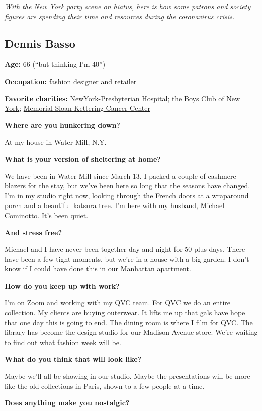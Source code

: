 \emph{With the New York party scene on hiatus, here is how some patrons
and society figures are spending their time and resources during the
coronavirus crisis.}

\hypertarget{dennis-basso}{%
\subsection{Dennis Basso}\label{dennis-basso}}

\textbf{Age:} 66 (``but thinking I'm 40'')

\textbf{Occupation:} fashion designer and retailer

\textbf{Favorite charities:}
\href{https://www.nyp.org}{NewYork-Presbyterian Hospital;}
\href{https://www.bcny.org}{the Boys Club of New York};
\href{https://www.mskcc.org}{Memorial Sloan Kettering Cancer Center}

\textbf{Where are you hunkering down?}

At my house in Water Mill, N.Y.

\textbf{What is your version of sheltering at home?}

We have been in Water Mill since March 13. I packed a couple of cashmere
blazers for the stay, but we've been here so long that the seasons have
changed. I'm in my studio right now, looking through the French doors at
a wraparound porch and a beautiful katsura tree. I'm here with my
husband, Michael Cominotto. It's been quiet.

\textbf{And stress free?}

Michael and I have never been together day and night for 50-plus days.
There have been a few tight moments, but we're in a house with a big
garden. I don't know if I could have done this in our Manhattan
apartment.

\textbf{How do you keep up with work?}

I'm on Zoom and working with my QVC team. For QVC we do an entire
collection. My clients are buying outerwear. It lifts me up that gals
have hope that one day this is going to end. The dining room is where I
film for QVC. The library has become the design studio for our Madison
Avenue store. We're waiting to find out what fashion week will be.

\textbf{What do you think that will look like?}

Maybe we'll all be showing in our studio. Maybe the presentations will
be more like the old collections in Paris, shown to a few people at a
time.

\textbf{Does anything make you nostalgic?}

